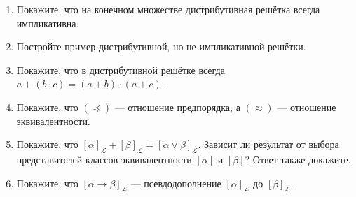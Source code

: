 \documentclass[10pt,a4paper,oneside]{article}
\begin{document}
\begin{enumerate}
\item Покажите, что на конечном множестве дистрибутивная решётка всегда импликативна.
\item Постройте пример дистрибутивной, но не импликативной решётки.
\item Покажите, что в дистрибутивной решётке всегда $a + (b \cdot c) = (a + b) \cdot (a + c)$.

\item Покажите, что $(\preceq)$ --- отношение предпорядка, а $(\approx)$ --- отношение эквивалентности.
\item Покажите, что $[\alpha]_\mathcal{L} + [\beta]_\mathcal{L} = [\alpha\vee\beta]_\mathcal{L}$.
Зависит ли результат от выбора представителей классов эквивалентности $[\alpha]$ и $[\beta]$? Ответ также докажите.
\item Покажите, что $[\alpha\rightarrow\beta]_\mathcal{L}$ --- псевдодополнение $[\alpha]_\mathcal{L}$ до $[\beta]_\mathcal{L}$.


\end{enumerate}
\end{document}

